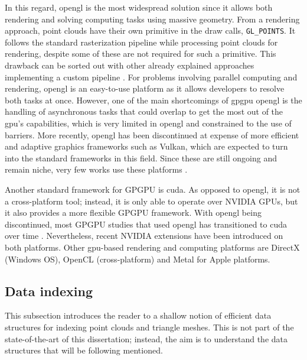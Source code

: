 In this regard, \acrshort{opengl} is the most widespread solution since it allows both rendering and solving computing tasks using massive geometry. From a rendering approach, point clouds have their own primitive in the draw calls, \verb|GL_POINTS|. It follows the standard rasterization pipeline while processing point clouds for rendering, despite some of these are not required for such a primitive. This drawback can be sorted out with other already explained approaches implementing a custom pipeline \cite{schutz_rendering_2021, schutz_software_2022}. For problems involving parallel computing and rendering, \acrshort{opengl} is an easy-to-use platform as it allows developers to resolve both tasks at once. However, one of the main shortcomings of \acrshort{gpgpu} \acrshort{opengl} is the handling of asynchronous tasks that could overlap to get the most out of the \acrshort{gpu}'s capabilities, which is very limited in \acrshort{opengl} and constrained to the use of barriers. More recently, \acrshort{opengl} has been discontinued at expense of more efficient and adaptive graphics frameworks such as Vulkan, which are expected to turn into the standard frameworks in this field. Since these are still ongoing and remain niche, very few works use these platforms \cite{stumpfegger_gpu_2022}.  

Another standard framework for GPGPU is \acrshort{cuda}. As opposed to \acrshort{opengl}, it is not a cross-platform tool; instead, it is only able to operate over NVIDIA GPUs, but it also provides a more flexible GPGPU framework. With \acrshort{opengl} being discontinued, most GPGPU studies that used \acrshort{opengl} has transitioned to \acrshort{cuda} over time \cite{schutz_gpu-accelerated_2023}. Nevertheless, recent NVIDIA extensions have been introduced on both platforms. Other \acrshort{gpu}-based rendering and computing platforms are DirectX \cite{baek_accelerated_2020} (Windows OS), OpenCL (cross-platform) and Metal for Apple platforms.

\subsection{Data indexing}

This subsection introduces the reader to a shallow notion of efficient data structures for indexing point clouds and triangle meshes. This is not part of the state-of-the-art of this dissertation; instead, the aim is to understand the data structures that will be following mentioned.

